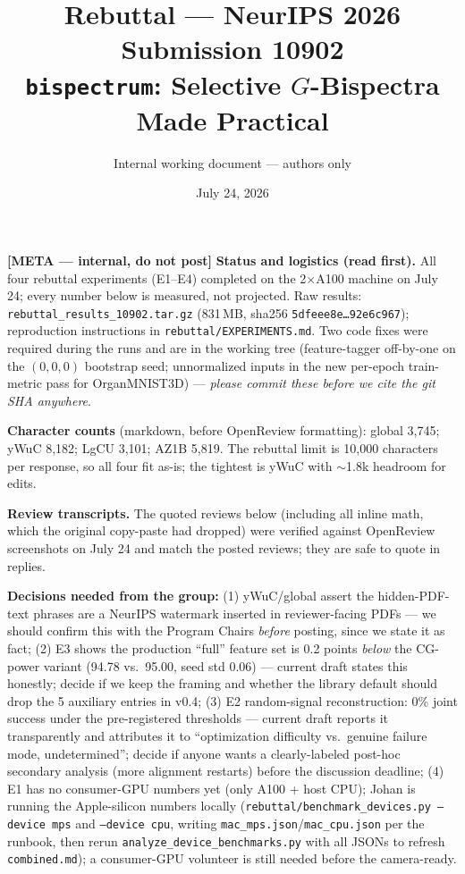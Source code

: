 \documentclass[10pt]{article}
\title{Rebuttal --- NeurIPS 2026 Submission 10902\\
\large \texttt{bispectrum}: Selective $G$-Bispectra Made Practical}
\author{Internal working document --- authors only}
\date{July 24, 2026}
\newenvironment{metacomment}%
  {\par\medskip\noindent\begingroup%
   \setlength{\fboxsep}{8pt}%
   \noindent\begin{lrbox}{\metabox}\begin{minipage}{\dimexpr\linewidth-2\fboxsep\relax}%
   \small\sffamily\color{metablue}%
   \textbf{[META --- internal, do not post]}\quad}%
  {\end{minipage}\end{lrbox}%
   \noindent\colorbox{metabg}{\usebox{\metabox}}\endgroup\par\medskip}
\begin{document}
\maketitle

\begin{metacomment}
\textbf{Status and logistics (read first).}
All four rebuttal experiments (E1--E4) completed on the 2$\times$A100 machine
on July 24; every number below is measured, not projected. Raw results:
\texttt{rebuttal\_results\_10902.tar.gz} (831\,MB, sha256
\texttt{5dfeee8e\ldots92e6c967}); reproduction instructions in
\texttt{rebuttal/EXPERIMENTS.md}. Two code fixes were required during the runs
and are in the working tree (feature-tagger off-by-one on the $(0,0,0)$
bootstrap seed; unnormalized inputs in the new per-epoch train-metric pass for
OrganMNIST3D) --- \emph{please commit these before we cite the git SHA
anywhere}.

\textbf{Character counts} (markdown, before OpenReview formatting): global
3{,}745; yWuC 8{,}182; LgCU 3{,}101; AZ1B 5{,}819. The rebuttal limit is
10{,}000 characters per response, so all four fit as-is; the tightest is
yWuC with $\sim$1.8k headroom for edits.

\textbf{Review transcripts.} The quoted reviews below (including all inline
math, which the original copy-paste had dropped) were verified against
OpenReview screenshots on July 24 and match the posted reviews; they are safe
to quote in replies.

\textbf{Decisions needed from the group:}
(1) yWuC/global assert the hidden-PDF-text phrases are a NeurIPS watermark
inserted in reviewer-facing PDFs --- we should confirm this with the Program
Chairs \emph{before} posting, since we state it as fact;
(2) E3 shows the production ``full'' feature set is 0.2 points \emph{below}
the CG-power variant (94.78 vs.\ 95.00, seed std 0.06) --- current draft
states this honestly; decide if we keep the framing and whether the library
default should drop the 5 auxiliary entries in v0.4;
(3) E2 random-signal reconstruction: 0\% joint success under the
pre-registered thresholds --- current draft reports it transparently and
attributes it to ``optimization difficulty vs.\ genuine failure mode,
undetermined''; decide if anyone wants a clearly-labeled post-hoc secondary
analysis (more alignment restarts) before the discussion deadline;
(4) E1 has no consumer-GPU numbers yet (only A100 + host CPU); Johan is
running the Apple-silicon numbers locally
(\texttt{rebuttal/benchmark\_devices.py --device mps} and \texttt{--device
cpu}, writing \texttt{mac\_mps.json}/\texttt{mac\_cpu.json} per the runbook,
then rerun \texttt{analyze\_device\_benchmarks.py} with all JSONs to refresh
\texttt{combined.md}); a consumer-GPU volunteer is still needed before the
camera-ready.
\end{metacomment}
\end{document}
